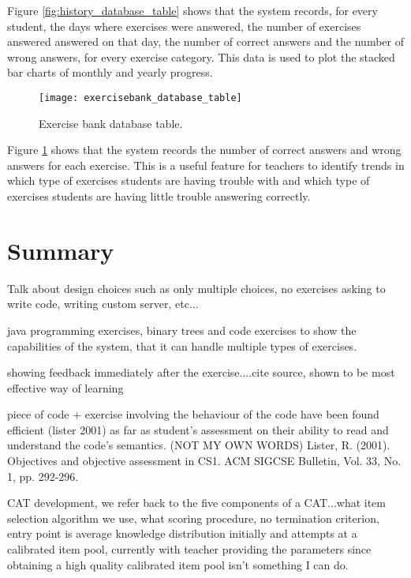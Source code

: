 Figure \ref{fig:history_database_table} shows that the system records, for every student, the days where exercises were answered, the number of exercises answered answered on that day, the number of correct answers and the number of wrong answers, for every exercise category. This data is used to plot the stacked bar charts of monthly and yearly progress.

\begin{figure}[H]
\centering
\texttt{[image: exercisebank\_database\_table]}
\caption{Exercise bank database table.}
\label{fig:exercisebank_database_table}
\end{figure}

Figure \ref{fig:exercisebank_database_table} shows that the system records the number of correct answers and wrong answers for each exercise. This is a useful feature for teachers to identify trends in which type of exercises students are having trouble with and which type of exercises students are having little trouble answering correctly.

\section{Summary}

\newpage

Talk about design choices such as only multiple choices, no exercises asking to write code, writing custom server, etc...\newline

java programming exercises, binary trees and code exercises to show the capabilities of the system, that it can handle multiple types of exercises.\newline

showing feedback immediately after the exercise....cite source, shown to be most effective way of learning\newline

piece of code + exercise involving the behaviour of the code have been found efficient (lister 2001) as far as student's assessment on their ability to read and understand the code's semantics. (NOT MY OWN WORDS) Lister, R. (2001). Objectives and objective assessment in CS1. ACM SIGCSE Bulletin, Vol. 33, No. 1, pp. 292-296. \newline

CAT development, we refer back to the five components of a CAT...what item selection algorithm we use, what scoring procedure, no termination criterion, entry point is average knowledge distribution initially and attempts at a calibrated item pool, currently with teacher providing the parameters since obtaining a high quality calibrated item pool isn't something I can do.
